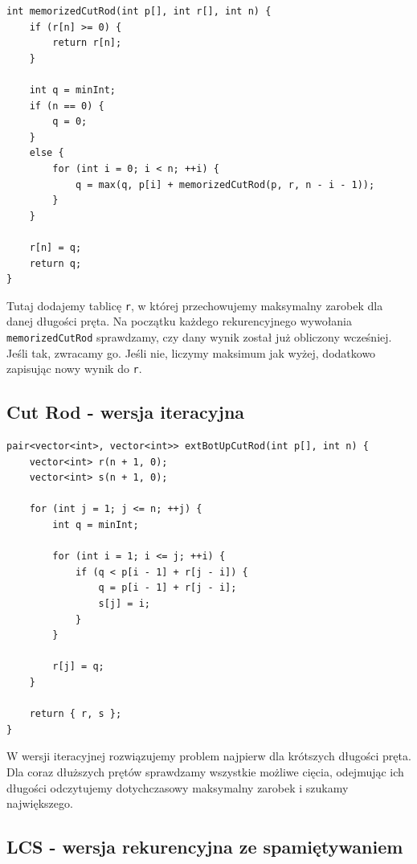 \documentclass{article}
\begin{document}
\begin{verbatim}
int memorizedCutRod(int p[], int r[], int n) {
    if (r[n] >= 0) {
        return r[n];
    }

    int q = minInt;
    if (n == 0) {
        q = 0;
    }
    else {
        for (int i = 0; i < n; ++i) {
            q = max(q, p[i] + memorizedCutRod(p, r, n - i - 1));
        }
    }

    r[n] = q;
    return q;
}
\end{verbatim}

Tutaj dodajemy tablicę \texttt{r}, w której przechowujemy maksymalny zarobek dla danej długości pręta. Na początku każdego rekurencyjnego wywołania \texttt{memorizedCutRod} sprawdzamy, czy dany wynik został już obliczony wcześniej. Jeśli tak, zwracamy go. Jeśli nie, liczymy maksimum jak wyżej, dodatkowo zapisując nowy wynik do \texttt{r}.

\subsection{Cut Rod - wersja iteracyjna}

\begin{verbatim}
pair<vector<int>, vector<int>> extBotUpCutRod(int p[], int n) {
    vector<int> r(n + 1, 0);
    vector<int> s(n + 1, 0);

    for (int j = 1; j <= n; ++j) {
        int q = minInt;

        for (int i = 1; i <= j; ++i) {
            if (q < p[i - 1] + r[j - i]) {
                q = p[i - 1] + r[j - i];
                s[j] = i;
            }
        }

        r[j] = q;
    }

    return { r, s };
}
\end{verbatim}

W wersji iteracyjnej rozwiązujemy problem najpierw dla krótszych długości pręta. Dla coraz dłuższych prętów sprawdzamy wszystkie możliwe cięcia, odejmując ich długości odczytujemy dotychczasowy maksymalny zarobek i szukamy największego.

\subsection{LCS - wersja rekurencyjna ze spamiętywaniem}
\end{document}
